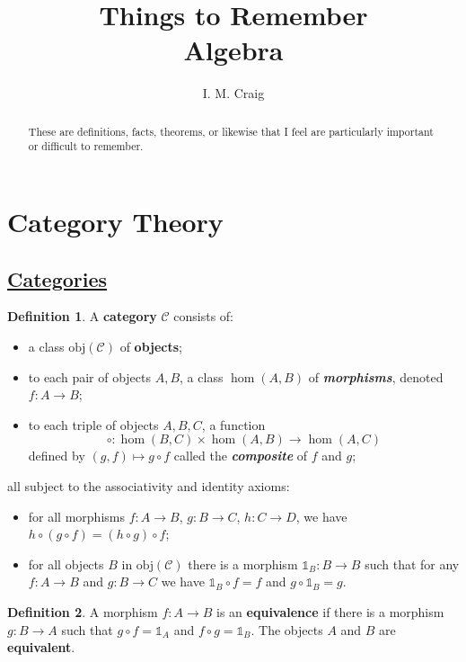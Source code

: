 \documentclass[11pt]{amsart}
\title{Things to Remember \\ Algebra}
\author{I. M. Craig}
\theoremstyle{definition}
\newtheorem*{definition*}{Definition}
\renewcommand\:{\colon}
\newcommand{\calC}{\mathcal{C}}
\newcommand{\1}{\mathds{1}}
\newcommand{\obj}{\text{obj}}
\begin{document}
\begin{abstract}
These are definitions, facts, theorems, or likewise that I feel are particularly important or difficult to remember. 
\end{abstract}

\maketitle


\vskip90pt

\section{Category Theory}

\subsection*{\underline{Categories}}

\begin{definition*}
	A \textbf{category} $\calC$ consists of: 
	\begin{itemize}[leftmargin=12.5pt]\setlength\itemsep{0em}
		\item a class $\obj(\calC)$ of \textbf{objects}; 
		\item to each pair of objects $A, B$, a class $\hom(A, B)$ of \textbf{\textit{morphisms}}, denoted $f\: A \to B$;
		\item to each triple of objects $A, B, C$, a function $$\circ\: \hom(B, C) \times \hom(A, B) \to \hom(A, C)$$ defined by $(g, f) \mapsto g \circ f$ called the \textbf{\textit{composite}} of $f$ and $g$;
	\end{itemize}
	all subject to the associativity and identity axioms:
	\begin{itemize}[leftmargin=12.5pt]\setlength\itemsep{0em}
		\item for all morphisms $f\: A \to B$, $g\: B \to C$, $h\: C \to D$, we have $h \circ (g \circ f) = (h \circ g) \circ f$;
		\item for all objects $B$ in $\obj(\calC)$ there is a morphism $\1_B\: B \to B$ such that for any $f\: A \to B$ and $g\: B \to C$ we have $\1_B \circ f = f$ and $g \circ \1_B = g$.
	\end{itemize}
\end{definition*}

\begin{definition*}
	A morphism $f\: A \to B$ is an \textbf{equivalence} if there is a morphism $g\: B \to A$ such that $g \circ f = \1_A$ and $f \circ g = \1_B$. The objects $A$ and $B$ are \textbf{equivalent}.
\end{definition*}
\end{document}
